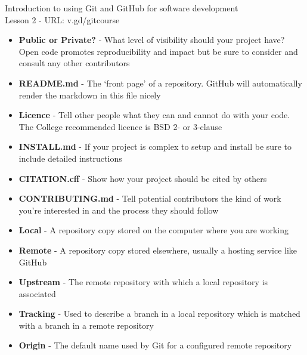 \documentclass[10pt]{extarticle}
\def\itempad{0pt}
\begin{document}
\thispagestyle{empty}

\begin{center}
  {\Large
  Introduction to using Git and GitHub for software development\\Lesson 2 - URL: v.gd/gitcourse}
\end{center}

\begin{navybox}[title=Things to think about when publishing code]
  \begin{itemize}
    \itemsep\itempad
  \item \textbf{Public or Private?} - What level of visibility should your
    project have? Open code promotes reproducibility and impact but be sure
    to consider and consult any other contributors
  \item \textbf{README.md} - The `front page' of a repository. GitHub will
    automatically render the markdown in this file nicely
  \item \textbf{Licence} - Tell other people what they can and cannot do with
    your code. The College recommended licence is BSD 2- or 3-clause
  \item \textbf{INSTALL.md} - If your project is complex to setup and install be
    sure to include detailed instructions
  \item \textbf{CITATION.cff} - Show how your project should be cited by others
  \item \textbf{CONTRIBUTING.md} - Tell potential contributors the kind of work
    you're interested in and the process they should follow
  \end{itemize}
\end{navybox}

\begin{bluebox}[title=Git Glossary]
  \begin{itemize}
      \itemsep\itempad
    \item \textbf{Local} - A repository copy stored on the computer where you
      are working
    \item \textbf{Remote} - A repository copy stored elsewhere, usually a
      hosting service like GitHub
    \item \textbf{Upstream} - The remote repository with which a local
      repository is associated
    \item \textbf{Tracking} - Used to describe a branch in a local repository
      which is matched with a branch in a remote repository
    \item \textbf{Origin} - The default name used by Git for a configured remote
      repository
  \end{itemize}
\end{bluebox}
\end{document}

